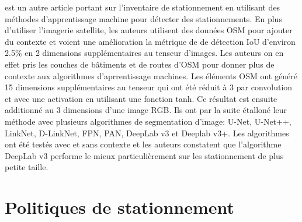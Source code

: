 \textcite{Yin:ContextenrichedSatellite:2022} est un autre article portant sur l'inventaire de stationnement en utilisant des méthodes d'apprentissage machine pour détecter des stationnements. En plus d'utiliser l'imagerie satellite, les auteurs utilisent des données \ac{OSM} pour ajouter du contexte et voient une amélioration la métrique de de détection \ac{IoU} d'environ 2.5\% en 2 dimensions supplémentaires au tenseur d'images. Les auteurs on en effet pris les couches de bâtiments et de routes d'\ac{OSM} pour donner plus de contexte aux algorithmes d'aprrentissage machines. Les éléments OSM ont généré 15 dimensions supplémentaires au tenseur qui ont été réduit à 3 par convolution et avec une activation en utilisant une fonction tanh. Ce résultat est ensuite additionné au 3 dimensions d'une image RGB. Ils ont par la suite étalloné leur méthode avec plusieurs algorithmes de segmentation d'image: U-Net, U-Net++, LinkNet, D-LinkNet, FPN, PAN, DeepLab v3 et Deeplab v3+. Les algorithmes ont été testés avec et sans contexte et les auteurs constatent que l'algorithme DeepLab v3 performe le mieux particulièrement sur les stationnement de plus petite taille.

\section{Politiques de stationnement}
